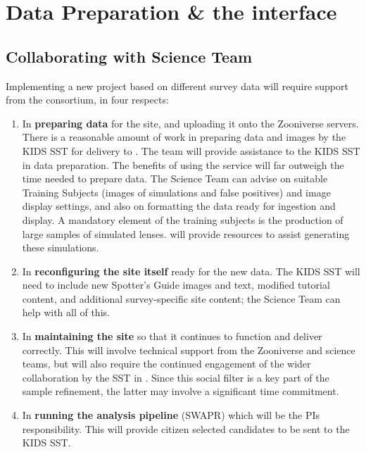 \documentclass[a4paper,twocolumn]{article}
\begin{document}

\section{Data Preparation \& the \SW interface}
\label{sec:data}

\subsection{Collaborating with \SW Science Team}

Implementing a new project based on different survey data will require support from the \SW consortium, in four respects: 

\begin{enumerate}

\item In {\bf preparing data} for the site, and uploading it onto the
Zooniverse servers. There is a reasonable amount of work in preparing data and images by the KIDS SST for delivery to \SW. The \SW team will provide assistance to the KIDS SST in data preparation. The benefits of using the \SW service will far outweigh the time needed to prepare data.  The \SW Science Team can advise on suitable Training
Subjects (images of simulations and false positives) and image display settings, and also on formatting the data
ready for ingestion and display. A mandatory element of the training subjects is the production of large samples of simulated lenses. \SW will provide resources to assist generating these simulations. 

\item In {\bf reconfiguring the site itself} ready for the new data. The KIDS
SST will need to include new Spotter's Guide images and text,
modified tutorial content, and additional survey-specific site content;
the \SW Science Team can help with all of this.

\item In {\bf maintaining the site} so that it continues to function and deliver
correctly. This will involve technical support from the Zooniverse and \SW science teams,
but will also require the continued engagement of the wider
collaboration by the SST in \Talk. Since this social filter is
a key part of the sample refinement, the latter may involve a
significant time commitment.

\item In {\bf running the \SW analysis pipeline} (SWAPR) which will be the \sw PIs responsibility. This will provide citizen selected candidates to be sent to the KIDS SST.

\end{enumerate}
\end{document}
